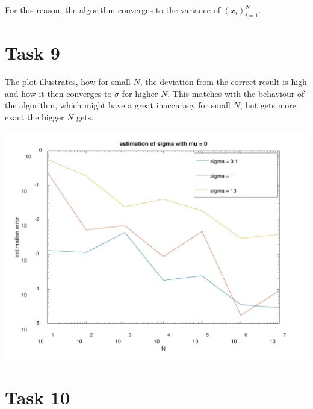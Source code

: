\documentclass[10pt,a4paper]{article}
\begin{document}
For this reason, the algorithm converges to the variance of $(x_i)_{i=1}^N$.

\newpage

\section*{Task 9}

The plot illustrates, how for small $N$, the deviation from the correct result is high and how it then converges to $\sigma$ for higher $N$. This matches with the behaviour of the algorithm, which might have a great inaccuracy for small $N$, but gets more exact the bigger $N$ gets.

\begin{center}
\includegraphics[scale=0.3]{sigma_err.jpeg}
\end{center}

\section*{Task 10}
\end{document}
